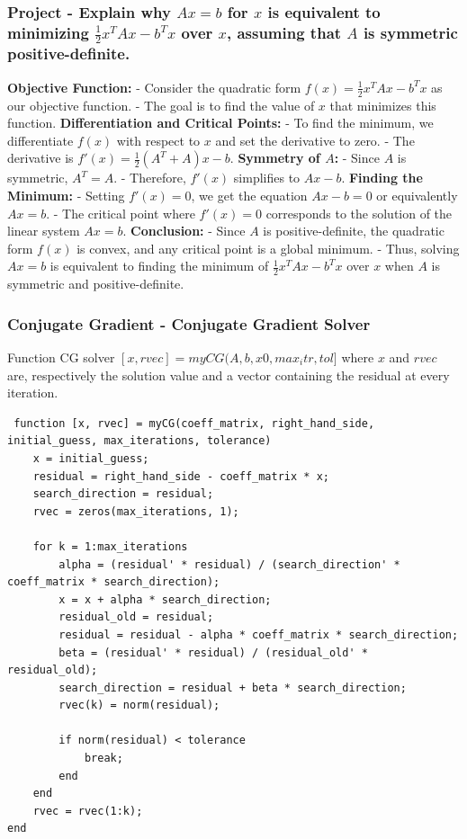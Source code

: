 \documentclass[unicode,11pt,a4paper,oneside,numbers=endperiod,openany]{scrartcl}
\begin{document}
\subsubsection{Project - Explain why $Ax=b$ for $x$ is equivalent to minimizing $\frac{1}{2}x^TAx-b^Tx$ over $x$, assuming that $A$ is symmetric positive-definite.}
\textbf{Objective Function:}
- Consider the quadratic form \( f(x) = \frac{1}{2}x^TAx - b^Tx \) as our objective function.
- The goal is to find the value of \( x \) that minimizes this function.
\newline\newline
\textbf{Differentiation and Critical Points:}
- To find the minimum, we differentiate \( f(x) \) with respect to \( x \) and set the derivative to zero.
- The derivative is \( f'(x) = \frac{1}{2}(A^T + A)x - b \).
\newline\newline
\textbf{Symmetry of \( A \):}
- Since \( A \) is symmetric, \( A^T = A \).
- Therefore, \( f'(x) \) simplifies to \( Ax - b \).
\newline\newline
\textbf{Finding the Minimum:}
- Setting \( f'(x) = 0 \), we get the equation \( Ax - b = 0 \) or equivalently \( Ax = b \).
- The critical point where \( f'(x) = 0 \) corresponds to the solution of the linear system \( Ax = b \).
\newline\newline
\textbf{Conclusion:}
- Since \( A \) is positive-definite, the quadratic form \( f(x) \) is convex, and any critical point is a global minimum.
- Thus, solving \( Ax = b \) is equivalent to finding the minimum of \( \frac{1}{2}x^TAx - b^Tx \) over \( x \) when \( A \) is symmetric and positive-definite.
\subsubsection{Conjugate Gradient - Conjugate Gradient Solver}
Function CG solver $[x,rvec]=myCG(A,b,x0,max_itr,tol]$ where $x$ and $rvec$ are, respectively the solution value and a vector containing the residual at every iteration.
\begin{lstlisting}
 function [x, rvec] = myCG(coeff_matrix, right_hand_side, initial_guess, max_iterations, tolerance)
    x = initial_guess;
    residual = right_hand_side - coeff_matrix * x;
    search_direction = residual;
    rvec = zeros(max_iterations, 1);

    for k = 1:max_iterations
        alpha = (residual' * residual) / (search_direction' * coeff_matrix * search_direction);
        x = x + alpha * search_direction;
        residual_old = residual;
        residual = residual - alpha * coeff_matrix * search_direction;
        beta = (residual' * residual) / (residual_old' * residual_old);
        search_direction = residual + beta * search_direction;
        rvec(k) = norm(residual);

        if norm(residual) < tolerance
            break;
        end
    end
    rvec = rvec(1:k);
end
\end{lstlisting}
\end{document}
